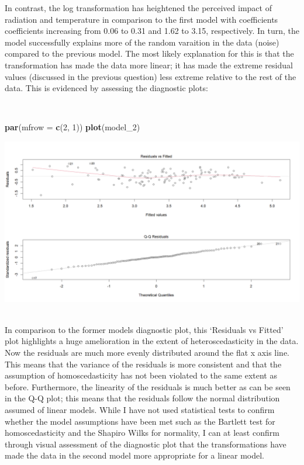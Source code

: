 \documentclass[
]{article}
\newenvironment{Shaded}{\begin{snugshade}}{\end{snugshade}}
\newcommand{\AttributeTok}[1]{\textcolor[rgb]{0.13,0.29,0.53}{#1}}
\newcommand{\DecValTok}[1]{\textcolor[rgb]{0.00,0.00,0.81}{#1}}
\newcommand{\FunctionTok}[1]{\textcolor[rgb]{0.13,0.29,0.53}{\textbf{#1}}}
\newcommand{\NormalTok}[1]{#1}
\begin{document}
In contrast, the log transformation has heightened the perceived impact
of radiation and temperature in comparison to the first model with
coefficients coefficients increasing from 0.06 to 0.31 and 1.62 to 3.15,
respectively. In turn, the model successfully explains more of the
random varaition in the data (noise) compared to the previous model. The
most likely explanation for this is that the transformation has made the
data more linear; it has made the extreme residual values (discussed in
the previous question) less extreme relative to the rest of the data.
This is evidenced by assessing the diagnostic plots:\\
\strut \\

\begin{Shaded}
\begin{Highlighting}[]
\FunctionTok{par}\NormalTok{(}\AttributeTok{mfrow =} \FunctionTok{c}\NormalTok{(}\DecValTok{2}\NormalTok{, }\DecValTok{1}\NormalTok{))}
\FunctionTok{plot}\NormalTok{(model\_2)}
\end{Highlighting}
\end{Shaded}

\hfill\break
\hfill\break
\includegraphics{images/7c_diagnostic_plots.png}\\
\strut \\

In comparison to the former models diagnostic plot, this `Residuals vs
Fitted' plot highlights a huge amelioration in the extent of
heteroscedasticity in the data. Now the residuals are much more evenly
distributed around the flat x axis line. This means that the variance of
the residuals is more consistent and that the assumption of
homoscedasticity has not been violated to the same extent as before.
Furthermore, the linearity of the residuals is much better as can be
seen in the Q-Q plot; this means that the residuals follow the normal
distribution assumed of linear models. While I have not used statistical
tests to confirm whether the model assumptions have been met such as the
Bartlett test for homoscedasticity and the Shapiro Wilks for normality,
I can at least confirm through visual assessment of the diagnostic plot
that the transformations have made the data in the second model more
appropriate for a linear model.
\end{document}
